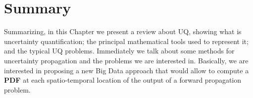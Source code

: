 %

\section{Summary}\label{sec:background_summary}

Summarizing, in this Chapter we present a review about UQ, showing what is uncertainty quantification; the principal mathematical tools used to represent it; and the typical UQ problems. Immediately we talk about some methods for uncertainty propagation and the problems we are interested in. Basically, we are interested in proposing a new Big Data approach that would allow to compute a \textbf{PDF} at each spatio-temporal location of the output of a forward propagation problem.


